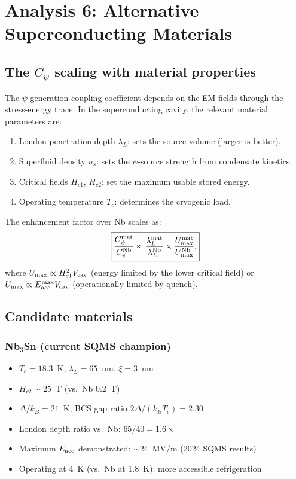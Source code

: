 \documentclass[11pt]{article}
\begin{document}
\section{Analysis 6: Alternative Superconducting Materials}
\label{sec:materials}

\subsection{The $C_\psi$ scaling with material properties}

The $\psi$-generation coupling coefficient depends on the EM fields through the
stress-energy trace. In the superconducting cavity, the relevant material
parameters are:
\begin{enumerate}
\item London penetration depth $\lambda_L$: sets the source volume (larger is better).
\item Superfluid density $n_s$: sets the $\psi$-source strength from condensate kinetics.
\item Critical fields $H_{c1}$, $H_{c2}$: set the maximum usable stored energy.
\item Operating temperature $T_c$: determines the cryogenic load.
\end{enumerate}

The enhancement factor over Nb scales as:
\begin{equation}
\boxed{\frac{C_\psi^{\rm mat}}{C_\psi^{\rm Nb}} \approx \frac{\lambda_L^{\rm mat}}{\lambda_L^{\rm Nb}}
\times \frac{U_{\rm max}^{\rm mat}}{U_{\rm max}^{\rm Nb}},}
\end{equation}
where $U_{\rm max} \propto H_{c1}^2 V_{\rm cav}$ (energy limited by the lower
critical field) or $U_{\rm max} \propto E_{\rm acc}^{\rm max} V_{\rm cav}$
(operationally limited by quench).

\subsection{Candidate materials}

\subsubsection{Nb$_3$Sn (current SQMS champion)}

\begin{itemize}
\item $T_c = 18.3$~K, $\lambda_L = 65$~nm, $\xi = 3$~nm
\item $H_{c2} \sim 25$~T (vs.\ Nb 0.2~T)
\item $\Delta/k_B = 21$~K, BCS gap ratio $2\Delta/(k_B T_c) = 2.30$
\item London depth ratio vs.\ Nb: $65/40 = 1.6\times$
\item Maximum $E_{\rm acc}$ demonstrated: $\sim 24$~MV/m (2024 SQMS results)
\item Operating at 4~K (vs.\ Nb at 1.8~K): more accessible refrigeration
\end{itemize}
\end{document}
